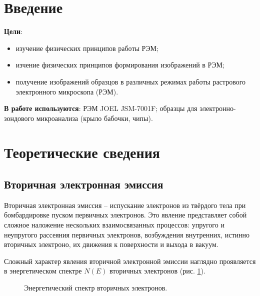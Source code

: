 \documentclass[a4paper,12pt]{article}	%
\begin{document}
	\newpage

\section{Введение}
	
\noindent \textbf{Цели}:

        \begin{itemize}
            \item изучение физических принципов работы РЭМ;

            \item изчение физических принципов формирования изображений в РЭМ;
            
            \item получение изображений образцов в различных режимах работы растрового электронного микроскопа (РЭМ).
            
        \end{itemize}

\noindent \textbf{В работе используются}: РЭМ JOEL JSM-7001F; образцы для электронно-зондового микроанализа (крыло бабочки, чипы).

\section{Теоретические сведения}

    \subsection{Вторичная электронная эмиссия}

\noindent Вторичная электронная эмиссия -- испускание электронов из твёрдого тела при бомбардировке пуском первичных электронов. Это явление представляет собой сложное наложение нескольких взаимосвязанных процессов: упругого и неупругого рассеяния первичных электронов, возбуждения внутренних, истинно вторичных электроно, их движения к поверхности и выхода в вакуум.

\medskip

\noindent Сложный характер явления вторичной электронной эмиссии наглядно проявляется в энергетическом спектре $N(E)$ вторичных электронов (рис. \ref{эл}).

    \begin{figure}[!h]
    	\caption{Энергетический спектр вторичных электронов.}
    	\label{эл}
    \end{figure}
\end{document}
